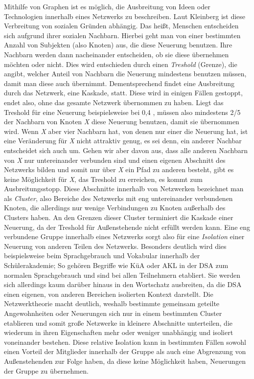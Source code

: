 Mithilfe von Graphen ist es möglich, die Ausbreitung von Ideen oder Technologien innerhalb eines Netzwerks zu beschreiben.
Laut Kleinberg ist diese Verbreitung von sozialen Gründen abhängig.
Das heißt, Menschen entscheiden sich aufgrund ihrer sozialen Nachbarn.
Hierbei geht man von einer bestimmten Anzahl von Subjekten (also Knoten) aus, die diese Neuerung benutzen.
Ihre Nachbarn werden dann nacheinander entscheiden, ob sie diese übernehmen möchten oder nicht.
Dies wird entschieden durch einen \emph{Treshold} (Grenze), die angibt, welcher Anteil von Nachbarn die Neuerung mindestens benutzen müssen, damit man diese auch übernimmt.
Dementsprechend findet eine Ausbreitung durch das Netzwerk, eine Kaskade, statt.
Diese wird in einigen Fällen gestoppt, endet also, ohne das gesamte Netzwerk übernommen zu haben.
Liegt das Treshold für eine Neuerung beispielsweise bei 0,4 , müssen also mindestens 2/5 der Nachbarn von Knoten \emph{X} diese Neuerung benutzen, damit sie übernommen wird.
Wenn \emph{X} aber vier Nachbarn hat, von denen nur einer die Neuerung hat, ist eine Veränderung für \emph{X} nicht attraktiv genug, es sei denn, ein anderer Nachbar entscheidet sich auch um.
Gehen wir aber davon aus, dass alle anderen Nachbarn von \emph{X} nur untereinander verbunden sind und einen eigenen Abschnitt des Netzwerks bilden und somit nur über \emph{X} ein Pfad zu anderen besteht, gibt es keine Möglichkeit für \emph{X}, das Treshold zu erreichen, es kommt zum Ausbreitungsstopp.
Diese Abschnitte innerhalb von Netzwerken bezeichnet man als \emph{Cluster}, also Bereiche des Netzwerks mit eng untereinander verbundenen Knoten, die allerdings nur wenige Verbindungen zu Knoten außerhalb des Clusters haben.
An den Grenzen dieser Cluster terminiert die Kaskade einer Neuerung, da der Treshold für Außenstehende nicht erfüllt werden kann.
Eine eng verbundene Gruppe innerhalb eines Netzwerks sorgt also für eine \emph{Isolation} einer Neuerung von anderen Teilen des Netzwerks.
Besonders deutlich wird dies beispielsweise beim Sprachgebrauch und Vokabular innerhalb der Schülerakademie;
So gehören Begriffe wie KüA oder AKL in der DSA zum normalen Sprachgebrauch und sind bei allen Teilnehmern etabliert.
Sie werden sich allerdings kaum darüber hinaus in den Wortschatz ausbreiten, da die DSA einen eigenen, von anderen Bereichen isolierten Kontext darstellt.
Die Netzwerktheorie macht deutlich, weshalb bestimmte gemeinsam geteilte Angewohnheiten oder Neuerungen sich nur in einem bestimmten Cluster etablieren und somit große Netzwerke in kleinere Abschnitte unterteilen, die wiederum in ihren Eigenschaften mehr oder weniger unabhängig und isoliert voneinander bestehen.
Diese relative Isolation kann in bestimmten Fällen sowohl einen Vorteil der Mitglieder innerhalb der Gruppe als auch eine Abgrenzung von Außenstehenden zur Folge haben, da diese keine Möglichkeit haben, Neuerungen der Gruppe zu übernehmen.



